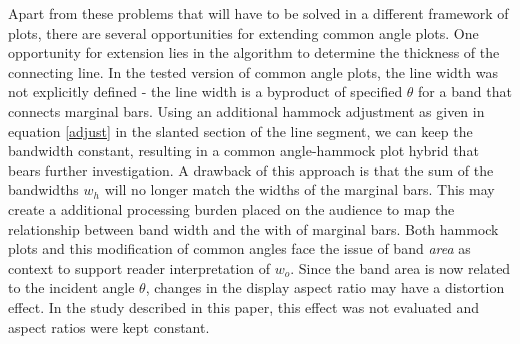 \documentclass[journal]{vgtc}\usepackage{graphicx, color}
\begin{document}

Apart from these problems that will have to be solved in a different framework of plots, there are several opportunities for extending common angle plots.
One opportunity for extension lies in the algorithm to determine the thickness of the connecting line. In the
tested version of common angle plots, the line width was not explicitly defined - the line width is a byproduct of 
specified $\theta$ for a band that connects marginal bars. Using an additional hammock adjustment as given in equation \ref{adjust} in the slanted section of the line segment, we can keep the bandwidth constant, resulting in a  common angle-hammock plot hybrid that bears further investigation.
A drawback of this approach is that the sum of the bandwidths $w_h$ will no longer match the widths of the marginal bars. 
This may create a additional processing burden placed on the audience to map the relationship between 
band width and the with of marginal bars. 
Both hammock plots and  this modification of common angles face  
the issue of band \emph{area} as context to support reader interpretation of $w_o$. Since the band
area is now related to the incident angle $\theta$, changes in the display aspect ratio may have a distortion 
effect. In the study described in this paper, this effect was not evaluated and aspect ratios were kept constant.
\end{document}
